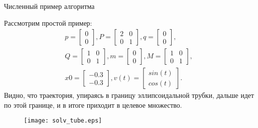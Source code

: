 \documentclass{beamer}
\begin{document}
\begin{frame}{Численный пример алгоритма}

  \begin{minipage}{0.45\textwidth}
    Рассмотрим простой пример:
    \begin{gather*}
        p = \begin{bmatrix}
                0 \\[0.3em]
                0
            \end{bmatrix},
        P = \begin{bmatrix}
                2 & 0 \\[0.3em]
                0 & 1
            \end{bmatrix},
        q = \begin{bmatrix}
                0 \\[0.3em]
                0
            \end{bmatrix}, \\
        Q = \begin{bmatrix}
                1 & 0 \\[0.3em]
                0 & 1
            \end{bmatrix},
        m = \begin{bmatrix}
                0 \\[0.3em]
                0
            \end{bmatrix},
        M = \begin{bmatrix}
                1 & 0 \\[0.3em]
                0 & 1
            \end{bmatrix}, \\
        x0 = \begin{bmatrix}
                -0.3 \\[0.3em]
                -0.3
            \end{bmatrix}, 
        v(t) = \begin{bmatrix}
                sin(t) \\[0.3em]
                cos(t)
            \end{bmatrix}.
    \end{gather*}
    Видно, что траектория, упираясь в границу эллипсоидальной трубки, дальше идет по этой границе, и в итоге приходит в целевое множество. 
  \end{minipage} \hfill
  \begin{minipage}{0.5\textwidth}
      \begin{figure}
        \texttt{[image: solv\_tube.eps]}
      \end{figure}
  \end{minipage}
  
\end{frame}
\end{document}
